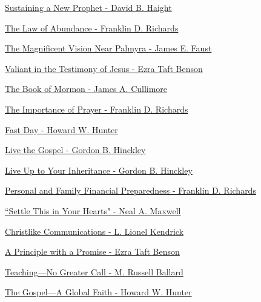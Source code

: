 \href{https://www.lds.org/general-conference/1995/04/sustaining-a-new-prophet?lang=eng}{Sustaining a New Prophet - David B. Haight}

\href{https://www.lds.org/general-conference/1971/04/the-law-of-abundance?lang=eng}{The Law of Abundance - Franklin D. Richards}

\href{https://www.lds.org/general-conference/1984/04/the-magnificent-vision-near-palmyra?lang=eng}{The Magnificent Vision Near Palmyra - James E. Faust}

\href{https://www.lds.org/general-conference/1982/04/valiant-in-the-testimony-of-jesus?lang=eng}{Valiant in the Testimony of Jesus - Ezra Taft Benson}

\href{https://www.lds.org/general-conference/1976/04/the-book-of-mormon?lang=eng}{The Book of Mormon - James A. Cullimore}

\href{https://www.lds.org/general-conference/1972/04/the-importance-of-prayer?lang=eng}{The Importance of Prayer - Franklin D. Richards}

\href{https://www.lds.org/general-conference/1985/10/fast-day?lang=eng}{Fast Day - Howard W. Hunter}

\href{https://www.lds.org/general-conference/1984/10/live-the-gospel?lang=eng}{Live the Gospel - Gordon B. Hinckley}

\href{https://www.lds.org/general-conference/1983/10/live-up-to-your-inheritance?lang=eng}{Live Up to Your Inheritance - Gordon B. Hinckley}

\href{https://www.lds.org/general-conference/1979/04/personal-and-family-financial-preparedness?lang=eng}{Personal and Family Financial Preparedness - Franklin D. Richards}

\href{https://www.lds.org/general-conference/1992/10/settle-this-in-your-hearts?lang=eng}{``Settle This in Your Hearts" - Neal A. Maxwell}

\href{https://www.lds.org/general-conference/1988/10/christlike-communications?lang=eng}{Christlike Communications - L. Lionel Kendrick}

\href{https://www.lds.org/general-conference/1983/04/a-principle-with-a-promise?lang=eng}{A Principle with a Promise - Ezra Taft Benson}

\href{https://www.lds.org/general-conference/1983/04/teaching-no-greater-call?lang=eng}{Teaching—No Greater Call - M. Russell Ballard}

\href{https://www.lds.org/general-conference/1991/10/the-gospel-a-global-faith?lang=eng}{The Gospel—A Global Faith - Howard W. Hunter}

